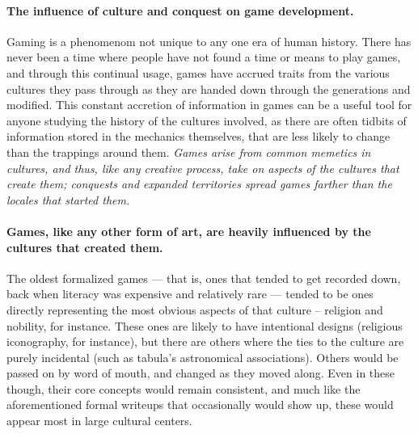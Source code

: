 \paragraph{The influence of culture and conquest on game development.}
Gaming is a phenomenom not unique to any one era of human history.
There has never been a time where people have not found a time or means to play games, and through this continual usage,
games have accrued traits from the various cultures they pass through as they are handed down through the generations and modified.
This constant accretion of information in games can be a useful tool for anyone studying the history of the cultures involved,
as there are often tidbits of information stored in the mechanics themselves, that are less likely to change than the trappings around them.
\emph{Games arise from common memetics in cultures, and thus, like any creative process, take on aspects of the cultures that create them;
conquests and expanded territories spread games farther than the locales that started them.}

\paragraph{Games, like any other form of art, are heavily influenced by the cultures that created them.}
The oldest formalized games --- that is, ones that tended to get recorded down, back when literacy was expensive and relatively rare ---
tended to be ones directly representing the most obvious aspects of that culture -- religion and nobility, for instance.
These ones are likely to have intentional designs (religious iconography, for instance), but there are others where the ties to the culture are purely incidental (such as tabula's astronomical associations).
Others would be passed on by word of mouth, and changed as they moved along.
Even in these though, their core concepts would remain consistent, and much like the aforementioned formal writeups that occasionally would show up,
these would appear most in large cultural centers.

